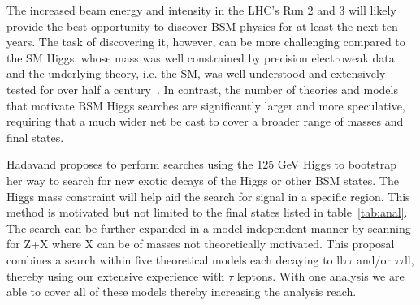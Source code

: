 \newcommand{\pt}{\mbox{$p_T$}}

The increased beam energy and intensity in the LHC’s Run 2 and 3 will likely provide the best 
opportunity to discover BSM physics for at least the next ten years.
The task of discovering it, however, can be more challenging compared to the SM Higgs, whose mass was well constrained by precision electroweak data and the underlying theory, i.e. the SM, 
was well understood and extensively tested for over half a century~\cite{eng,higgs1,higgs2,higgs3}. 
In contrast, the number of theories and models that motivate BSM Higgs searches are significantly larger and more speculative, requiring that a much wider net be cast to cover a broader range of masses and final states. 

Hadavand proposes to perform searches using the 125 GeV Higgs to bootstrap her way to search for new exotic decays of the Higgs or other BSM states.  
The Higgs mass constraint will help aid the search for signal in a specific region.  %
This method is motivated but not limited to the final states listed in table~\ref{tab:anal}. The search can be further expanded in a model-independent manner by scanning for Z+X where X can be of masses not theoretically motivated.
This proposal combines a search within five theoretical models each decaying to ll$\tau\tau$ and/or $\tau\tau$ll, thereby using our extensive experience with $\tau$ leptons.  With one analysis we are able to
cover all of these models thereby increasing the analysis reach.  


